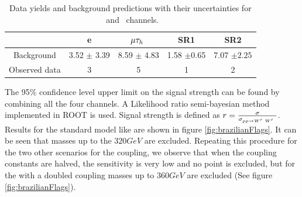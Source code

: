 \begin{table}[htb]
	\centering
	\begin{tabular}{|c|c|c|c|c|}
		\hline 
		  &e\Tau &  $\mu\tau_h~$ & \tauTau SR1 & \tauTau SR2 \\
		\hline 
	         Background &3.52 $\pm$ 3.39 &8.59 $\pm$ 4.83 &1.58 $\pm$0.65 &7.07 $\pm2.25$ \\     
		 Observed data& 3&5&1&2\\
		
		\hline
	\end{tabular}
	\caption{Data yields and background predictions with their uncertainties for \lepTau ~and \tauTau ~channels. \label{tab:yields} }
\end{table}

The 95\% confidence level upper limit on the signal strength can be found by combining all the four channels. A Likelihood ratio semi-bayesian method implemented in ROOT \cite{Brun:1997pa} is used. Signal strength is defined as $r = \frac{ \sigma }{\sigma_{pp \to W^\prime~W^\prime~} }$. Results for the standard model like \wprime are shown in figure  \ref{fig:brazilianFlags}. It can be seen that \wprime masses up to the $320GeV$ are excluded.  Repeating this procedure for the two other scenarios for the coupling, we observe that when the coupling constants are halved, the sensitivity is very low and no point is excluded, but for the \wprime with a doubled coupling masses up to $360GeV$ are excluded (See figure \ref{fig:brazilianFlags}).


